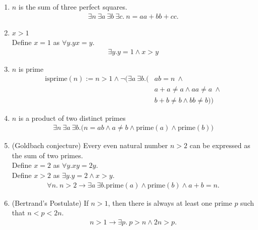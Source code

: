 \documentclass[12pt]{article}
\begin{document}
\begin{enumerate}

\item $n$ is the sum of three perfect squares.
  \begin{align*}
    \exists n ~\exists a ~\exists b ~\exists c. ~n = aa + bb + cc.
  \end{align*}

\item $x > 1$\\
  Define $x = 1$ as $\forall y. yx = y$.
  \begin{align*}
    \exists y. y = 1 \land x > y
  \end{align*}

\item $n$ is prime
  \begin{align*}
    \text{isprime}(n) := n > 1 \land \neg\Big(\exists a ~\exists b.
    \Big(
    &ab = n ~\land \\
    &a + a \neq a \land aa \neq a ~\land \\  %
    &b + b \neq b \land bb \neq b\Big)\Big)  %
  \end{align*}

\item $n$ is a product of two distinct primes
  \begin{align*}
    \exists n ~ \exists a ~ \exists b. \Big(n = ab \land a \neq b \land \text{prime}(a) \land \text{prime}(b)\Big)
  \end{align*}

\item (Goldbach conjecture) Every even natural number $n > 2$ can be expressed as the sum of two
  primes.\\
  Define $x = 2$ as $\forall y. xy = 2y$.\\
  Define $x > 2$ as $\exists y. y = 2 \land x > y$.
  \begin{align*}
    \forall n. ~ n > 2 \rightarrow \exists a ~\exists b. \text{prime}(a) \land \text{prime}(b) \land a + b = n.
  \end{align*}

\item (Bertrand's Postulate) If $n > 1$, then there is always at least one prime $p$ such that
  $n < p < 2n$.
  \begin{align*}
    n > 1 \rightarrow \exists p. ~p > n \land 2n > p.
  \end{align*}

\end{enumerate}
\end{document}
